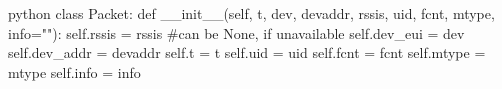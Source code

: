 \begin{mintedbox}[samepage]{python}
class Packet:
	def __init__(self, t, dev, devaddr, rssis, uid, fcnt, mtype, info=""):
		self.rssis = rssis  #can be None, if unavailable
		self.dev_eui = dev
		self.dev_addr = devaddr
		self.t = t
		self.uid = uid
		self.fcnt = fcnt
		self.mtype = mtype
		self.info = info
\end{mintedbox}

